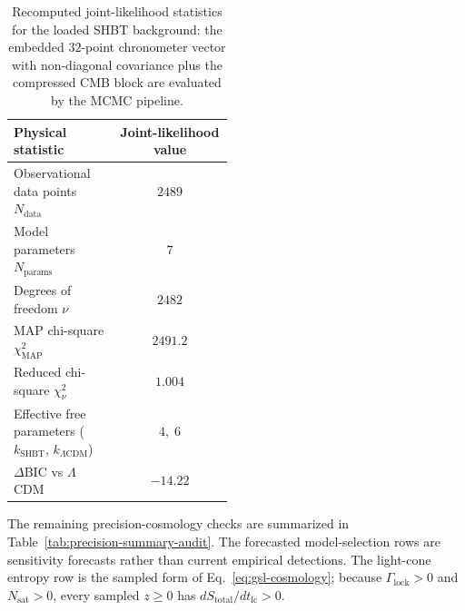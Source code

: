 \documentclass[11pt,letterpaper]{article}
\theoremstyle{plain}
\newcommand{\Nsat}{N_{\text{sat}}}
\newcommand{\lcdm}{\ensuremath{\Lambda\mathrm{CDM}}}
\newcommand{\GammaLock}{\Gamma_{\text{lock}}}
\begin{document}
\begin{table}[htbp]
\centering
\small
\begin{tabular}{@{}L{0.48\linewidth}c@{}}
\toprule
Physical statistic & Joint-likelihood value \\
\midrule
Observational data points \(N_{\text{data}}\) & \(2489\) \\
Model parameters \(N_{\text{params}}\) & \(7\) \\
Degrees of freedom \(\nu\) & \(2482\) \\
MAP chi-square \(\chi^2_{\mathrm{MAP}}\) & \(2491.2\) \\
Reduced chi-square \(\chi^2_{\nu}\) & \(1.004\) \\
Effective free parameters (\(k_{\text{SHBT}}\), \(k_{\lcdm}\)) & \(4,\;6\) \\
\(\Delta\mathrm{BIC}\) vs \(\Lambda\)CDM & \(-14.22\) \\
\bottomrule
\end{tabular}
\caption{Recomputed joint-likelihood statistics for the loaded
SHBT background: the embedded \(32\)-point chronometer vector with
non-diagonal covariance plus the compressed CMB block are evaluated by the
MCMC pipeline.}
\label{tab:chronometer-validation-audit}
\end{table}

The remaining precision-cosmology checks are summarized in
Table~\ref{tab:precision-summary-audit}.  The forecasted model-selection rows
are sensitivity forecasts rather than current empirical detections.  The
light-cone entropy row is the sampled form of Eq.~\eqref{eq:gsl-cosmology};
because \(\GammaLock>0\) and \(\Nsat>0\), every sampled \(z\ge0\) has
\(dS_{\text{total}}/dt_{\text{lc}}>0\).
\end{document}
